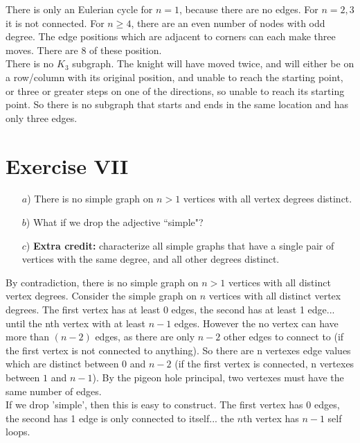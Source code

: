 \documentclass[fontsize=11pt]{scrartcl} %
\numberwithin{equation}{section} %
\numberwithin{figure}{section} %
\numberwithin{table}{section} %
\begin{document}
There is only an Eulerian cycle for $n=1$, because there are no edges.  For $n=2,3$ it is not connected.  For $n\geq 4$, there are an even number of nodes with odd degree.  The edge positions which are adjacent to corners can each make three moves.  There are 8 of these position.  \\

There is no $K_3$ subgraph.  The knight will have moved twice, and will either be on a row/column with its original position, and unable to reach the starting point, or three or greater steps on one of the directions, so unable to reach its starting point.  So there is no subgraph that starts and ends in the same location and has only three edges.  

\section*{Exercise VII}

	\begin{itemize}
		\item[$a$)] 
			There is no simple graph on $n > 1$ vertices with all vertex degrees distinct.

		\item[$b$)] What if we drop the adjective ``simple"?
		\item[$c$)] \textbf{Extra credit:} characterize all simple graphs that have a single pair
		of vertices with the same degree, and all other degrees distinct.
	\end{itemize}
	
	By contradiction, there is no simple graph on $n > 1$ vertices with all distinct vertex degrees.  Consider the simple graph on $n$ vertices with all distinct vertex degrees. The first vertex has at least 0 edges, the second has at least 1 edge... until the nth vertex with at least $n-1$ edges.  However the no vertex can have more than $(n-2)$ edges, as there are only $n-2$ other edges to connect to (if the first vertex is not connected to anything).  So there are n vertexes edge values which are distinct between $0$ and $n-2$ (if the first vertex is connected, n vertexes between $1$ and $n-1$).  By the pigeon hole principal, two vertexes must have the same number of edges.  \\
	
	If we drop 'simple', then this is easy to construct.  The first vertex has 0 edges, the second has 1 edge is only connected to itself... the $n$th vertex has $n-1$ self loops.  
\end{document}
